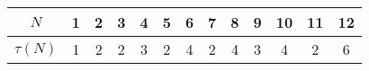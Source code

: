 \documentclass{article}
\begin{document}
\begin{tabular}{|c|c|c|c|c|c|c|c|c|c|c|c|c|}
    \hline
     $N$ & 1 & 2 & 3 & 4 & 5 & 6 & 7 & 8 & 9 & 10 & 11 & 12 \\
     \hline
     $\tau(N)$ & 1 & 2 & 2 & 3 & 2 & 4 & 2 & 4 & 3 & 4 & 2 & 6 \\
     \hline
\end{tabular}
\end{document}

